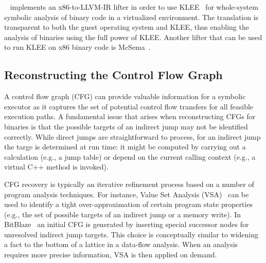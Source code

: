 {\sc \stwoe}~\cite{CKC-TOCS12} implements an x86-to-LLVM-IR lifter in order to use {\sc KLEE}~\cite{KLEE-OSDI08} for whole-system symbolic analysis of binary code in a virtualized environment. The translation is transparent to both the guest operating system and KLEE, thus enabling the analysis of binaries using the full power of {\sc KLEE}. Another lifter that can be used to run {\sc KLEE} on x86 binary code is McSema~\cite{mcsema}.

\subsection{Reconstructing the Control Flow Graph}

A control flow graph (CFG) can provide valuable information for a symbolic executor as it captures the set of potential control flow transfers for all feasible execution paths. A fundamental issue that arises when reconstructing CFGs for binaries is that the possible targets of an indirect jump may not be identified correctly. While direct jumps are straightforward to process, for an indirect jump the targe is determined at run time: it might be computed by carrying out a calculation (e.g., a jump table) or depend on the current calling context (e.g., a virtual C++ method is invoked). %

CFG recovery is typically an iterative refinement process based on a number of program analysis techniques. For instance, Value Set Analysis (VSA)~\cite{VSA-CC04} can be used to identify a tight over-approximation of certain program state properties (e.g., the set of possible targets of an indirect jump or a memory write). In {\sc BitBlaze}~\cite{BITBLAZE-ICISS08} an initial CFG is generated by inserting special successor nodes for unresolved indirect jump targets. This choice is conceptually similar to widening a fact to the bottom of a lattice in a data-flow analysis. When an analysis requires more precise information, VSA is then applied on demand. %

